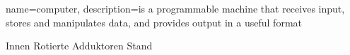 



{
  name=computer,
  description={is a programmable machine that receives input,
               stores and manipulates data, and provides
               output in a useful format}
}


	{Innen Rotierte Adduktoren Stand}